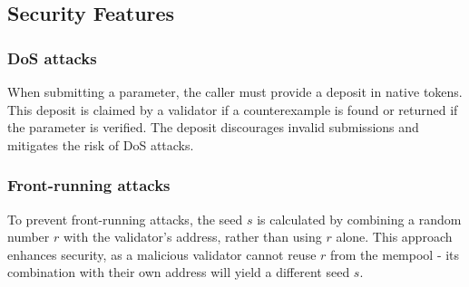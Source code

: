 \documentclass[runningheads]{llncs}
\begin{document}
\subsection{Security Features}
\subsubsection{DoS attacks}
When submitting a parameter, the caller must provide a deposit in native tokens. This deposit is claimed by a validator if a counterexample is found or returned if the parameter is verified. The deposit discourages invalid submissions and mitigates the risk of DoS attacks.
\subsubsection{Front-running attacks}
To prevent front-running attacks, the seed \( s \) is calculated by combining a random number \( r \) with the validator's address, rather than using \( r \) alone. This approach enhances security, as a malicious validator cannot reuse \( r \) from the mempool - its combination with their own address will yield a different seed \( s \).







\end{document}
